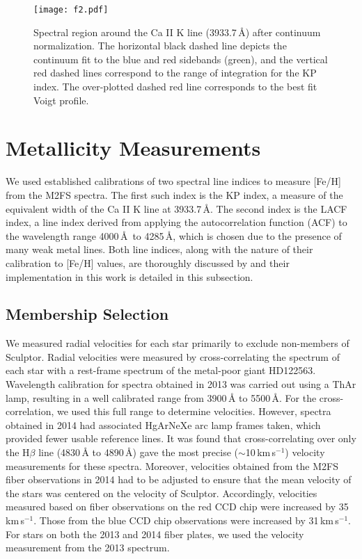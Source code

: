 \documentclass{emulateapj-rtx4}
\begin{document}

\begin{figure*}[!htbp]
\centering
\texttt{[image: f2.pdf]}
\caption{Spectral region around the Ca II K line (3933.7\,{\AA}) after continuum normalization. The horizontal black dashed line depicts the continuum fit to the blue and 
red sidebands (green), and the vertical red dashed lines correspond to 
the range of integration for the KP index. The over-plotted dashed red line corresponds to the best fit Voigt profile. }
\label{fig:KPexample}
\end{figure*}


\section{Metallicity Measurements}
\label{sec:Metallicity}

We used established calibrations of two spectral line indices to measure [Fe/H] from the M2FS spectra. The first such index is the 
KP index, a measure of the equivalent width of the Ca II K line at 3933.7\,\AA. The second index is
the LACF index, a line index derived from applying the autocorrelation 
function (ACF) to the wavelength range 4000\,\AA\, to 4285\,\AA, which is chosen due to the presence
of many weak metal lines. Both line indices, along with the nature of their calibration to
[Fe/H] values, are thoroughly discussed by \citet{brn+99} and their implementation
in this work is detailed in this subsection.

\subsection{Membership Selection}
\label{sec:membership}
We measured radial velocities for each star primarily to exclude non-members of Sculptor.
Radial velocities were measured by cross-correlating the spectrum of each star with a rest-frame spectrum of the metal-poor giant HD122563.
Wavelength calibration for spectra obtained in 2013 was carried out using a ThAr lamp, resulting in a well calibrated range from 3900\,\AA\,\,to 5500\,\AA.
For the cross-correlation, we used this full range to determine velocities.
However, spectra obtained in 2014 had associated HgArNeXe arc lamp frames taken, which provided fewer usable reference lines.
 It was found that cross-correlating over only the H$\beta$ line (4830\,\AA\,\,to 4890\,\AA) gave the most precise ($\sim$10\,km\,s$^{-1}$) velocity measurements for these spectra.
Moreover, velocities obtained from the M2FS fiber observations in 2014 had to be adjusted to ensure that the mean velocity of the stars was centered on the velocity of Sculptor. 
Accordingly, velocities measured based on fiber observations on the red CCD chip were increased by 35\,km\,s$^{-1}$. Those from the blue CCD chip observations were increased by 31\,km\,s$^{-1}$.
For stars on both the 2013 and 2014 fiber plates, we used the velocity measurement from the 2013 spectrum.
\end{document}

